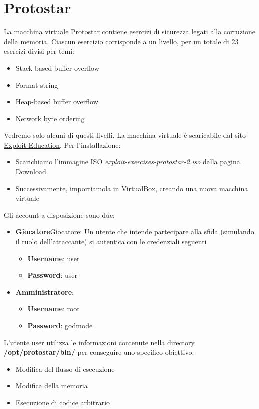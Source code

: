 \chapter{Protostar}
La macchina virtuale Protostar contiene esercizi di sicurezza legati alla corruzione della memoria. Ciascun esercizio corrisponde a un livello, per un totale di 23 esercizi divisi per temi:
\begin{itemize}
    \item Stack-based buffer overflow
    \item Format string
    \item Heap-based buffer overflow
    \item Network byte ordering
\end{itemize}
Vedremo solo alcuni di questi livelli.
La macchina virtuale è scaricabile dal sito \href{https://exploit.education/}{Exploit Education}.
Per l'installazione: 
\begin{itemize}
    \item Scarichiamo l'immagine ISO \textit{exploit-exercises-protostar-2.iso} dalla pagina \href{http://exploit.education/downloads/}{Download}.
    \item Successivamente, importiamola in VirtualBox, creando una nuova macchina virtuale
\end{itemize}
Gli account a disposizione sono due:
    \begin{itemize}
        \item \textbf{Giocatore}Giocatore: Un utente che intende partecipare alla sfida (simulando il ruolo dell'attaccante) si autentica con le credenziali seguenti
        \begin{itemize}
            \item \textbf{Username}: user
            \item \textbf{Password}: user
        \end{itemize}
        \item \textbf{Amministratore}:
        \begin{itemize}
            \item \textbf{Username}: root
            \item \textbf{Password}: godmode
        \end{itemize}
    \end{itemize}
    L'utente user utilizza le informazioni contenute nella directory \textbf{/opt/protostar/bin/} per conseguire uno specifico obiettivo:
    \begin{itemize}
        \item Modifica del flusso di esecuzione
        \item Modifica della memoria
        \item Esecuzione di codice arbitrario
    \end{itemize}
